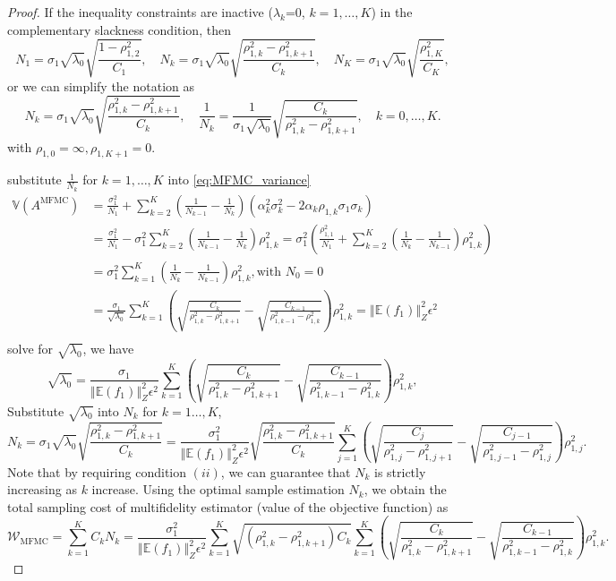 \documentclass[final,3p,times,11pt]{elsarticle}
\begin{document}
\begin{proof}
If the inequality constraints are inactive ($\lambda_k$=0, $k=1,\dots, K$) in the complementary slackness condition, then 
\[
N_1 = \sigma_1\sqrt{\lambda_0}\sqrt{\frac{1-\rho_{1,2}^2}{C_1}}, \quad N_k = \sigma_1\sqrt{\lambda_0}\sqrt{\frac{\rho_{1,k}^2-\rho_{1,k+1}^2}{C_k}}, \quad N_K = \sigma_1\sqrt{\lambda_0}\sqrt{\frac{\rho_{1,K}^2}{C_K}},
\]
or we can simplify the notation as
\[
N_k = \sigma_1\sqrt{\lambda_0}\sqrt{\frac{\rho_{1,k}^2-\rho_{1,k+1}^2}{C_k}},\quad  \frac{1}{N_k} = \frac{1}{\sigma_1\sqrt{\lambda_0}}\sqrt{\frac{C_k}{\rho_{1,k}^2-\rho_{1,k+1}^2}}, \quad k=0,\ldots,K.
\]
with $\rho_{1,0}=\infty, \rho_{1,K+1}=0$.


substitute $\frac{1}{N_k}$ for $k=1,\ldots, K$ into \eqref{eq:MFMC_variance}
\begin{align*}
    \mathbb{V}\left(A^{\text{MFMC}}\right)&=\frac{\sigma_1^2}{N_1} + \sum_{k=2}^K \left(\frac{1}{N_{k-1}} - \frac{1}{N_k}\right)\left(\alpha_k^2\sigma_k^2 - 2\alpha_k\rho_{1,k}\sigma_1\sigma_k\right)\\
    &=\frac{\sigma_1^2}{N_1} - \sigma_1^2\sum_{k=2}^K \left(\frac{1}{N_{k-1}} - \frac{1}{N_k}\right)\rho_{1,k}^2 = \sigma_1^2\left(\frac{\rho_{1,1}^2}{N_1} +\sum_{k=2}^K \left( \frac{1}{N_k} - \frac{1}{N_{k-1}}\right)\rho_{1,k}^2\right)\\
    &= \sigma_1^2\sum_{k=1}^K \left( \frac{1}{N_k} - \frac{1}{N_{k-1}}\right)\rho_{1,k}^2, \text{with } N_0=0\\
    &=\frac{\sigma_1}{\sqrt{\lambda_0}}\sum_{k=1}^{K} \left(\sqrt{\frac{C_k}{\rho_{1,k}^2-\rho_{1,k+1}^2}} - \sqrt{\frac{C_{k-1}}{\rho_{1,k-1}^2-\rho_{1,k}^2}}\right)\rho_{1,k}^2 =\left\Vert\mathbb{E}(f_1) \right\Vert_{Z}^2\epsilon^2\\
\end{align*}
solve for $\sqrt{\lambda_0}$, we have 
\[
\sqrt{\lambda_0} = \frac{\sigma_1}{\left\Vert\mathbb{E}(f_1) \right\Vert_{Z}^2\epsilon^2}\sum_{k=1}^{K} \left(\sqrt{\frac{C_k}{\rho_{1,k}^2-\rho_{1,k+1}^2}} - \sqrt{\frac{C_{k-1}}{\rho_{1,k-1}^2-\rho_{1,k}^2}}\right)\rho_{1,k}^2,
\]
Substitute $\sqrt{\lambda_0}$ into $N_k$ for $k=1\ldots,K$,
\[
N_k = \sigma_1\sqrt{\lambda_0}\sqrt{\frac{\rho_{1,k}^2-\rho_{1,k+1}^2}{C_k}}= \frac{\sigma_1^2}{\left\Vert\mathbb{E}(f_1) \right\Vert_{Z}^2\epsilon^2}\sqrt{\frac{\rho_{1,k}^2-\rho_{1,k+1}^2}{C_k}}\sum_{j=1}^{K} \left(\sqrt{\frac{C_j}{\rho_{1,j}^2-\rho_{1,j+1}^2}} - \sqrt{\frac{C_{j-1}}{\rho_{1,j-1}^2-\rho_{1,j}^2}}\right)\rho_{1,j}^2.
\]
Note that by requiring condition $(ii)$, we can guarantee that $N_k$ is strictly increasing as $k$ increase. Using the optimal sample estimation $N_k$, we obtain the total sampling cost of multifidelity estimator (value of the objective function) as
\begin{equation}\label{eq:MFMC_sampling_cost}
    \mathcal{W}_\text{MFMC} = \sum_{k=1}^K C_kN_k = \frac{\sigma_1^2}{\left\Vert\mathbb{E}(f_1) \right\Vert_{Z}^2\epsilon^2}\sum_{k=1}^K\sqrt{\left(\rho_{1,k}^2 - \rho_{1,k+1}^2\right)C_k}\sum_{k=1}^K\left(\sqrt{\frac{C_k}{\rho_{1,k}^2 - \rho_{1,k+1}^2}} - \sqrt{\frac{C_{k-1}}{\rho_{1,{k-1}}^2 - \rho_{1,k}^2}}\right)\rho_{1,k}^2.
\end{equation}




\end{proof}
\end{document}
